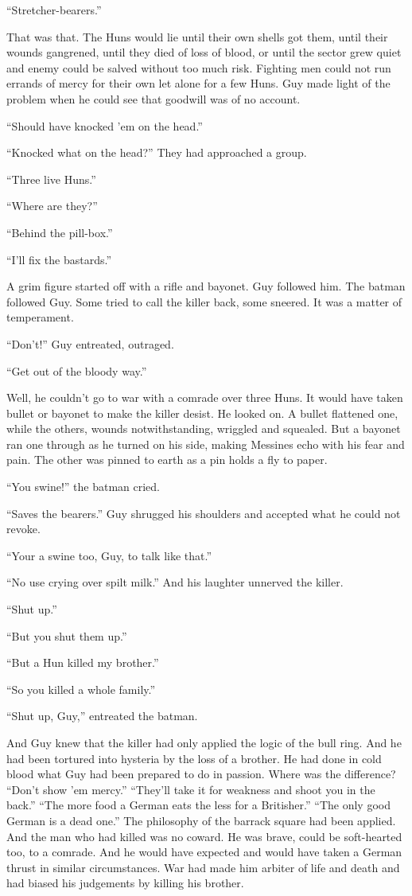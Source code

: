 ``Stretcher-bearers.''

That was that. The Huns would lie until their own shells got them, until their wounds gangrened, until they died of loss of blood, or until the sector grew quiet and enemy could be salved without too much risk. Fighting men could not run errands of mercy for their own let alone for a few Huns. Guy made light of the problem when he could see that goodwill was of no account.

``Should have knocked 'em on the head.''

``Knocked what on the head?'' They had approached a group.

``Three live Huns.''

``Where are they?''

``Behind the pill-box.''

``I'll fix the bastards.''

A grim figure started off with a rifle and bayonet. Guy followed him. The batman followed Guy. Some tried to call the killer back, some sneered. It was a matter of temperament.

``Don't!'' Guy entreated, outraged.

``Get out of the bloody way.''

Well, he couldn't go to war with a comrade over three Huns. It would have taken bullet or bayonet to make the killer desist. He looked on. A bullet flattened one, while the others, wounds notwithstanding, wriggled and squealed. But a bayonet ran one through as he turned on his side, making Messines echo with his fear and pain. The other was pinned to earth as a pin holds a fly to paper.

``You swine!'' the batman cried.

``Saves the bearers.'' Guy shrugged his shoulders and accepted what he could not revoke.

``Your a swine too, Guy, to talk like that.''

``No use crying over spilt milk.'' And his laughter unnerved the killer.

``Shut up.''

``But you shut them up.''

``But a Hun killed my brother.''

``So you killed a whole family.''

``Shut up, Guy,'' entreated the batman.

And Guy knew that the killer had only applied the logic of the bull ring. And he had been tortured into hysteria by the loss of a brother. He had done in cold blood what Guy had been prepared to do in passion. Where was the difference? ``Don't show 'em mercy.'' ``They'll take it for weakness and shoot you in the back.'' ``The more food a German eats the less for a Britisher.'' ``The only good German is a dead one.'' The philosophy of the barrack square had been applied. And the man who had killed was no coward. He was brave, could be soft-hearted too, to a comrade. And he would have expected and would have taken a German thrust in similar circumstances. War had made him arbiter of life and death and had biased his judgements by killing his brother.


